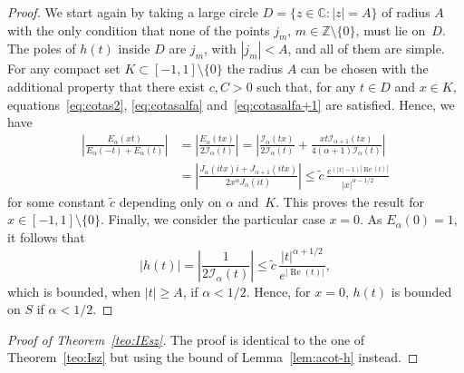 \documentclass[a4paper]{amsart}
\newcommand{\Z}{\mathbb{Z}}
\newcommand{\C}{\mathbb{C}}
\newcommand{\I}{\mathcal{I}}
\newcommand{\Ea}{E_{\alpha}}
\renewcommand{\Re}{\operatorname{Re}}
\renewcommand{\Im}{\operatorname{Im}}
\theoremstyle{plain}
\theoremstyle{definition}
\theoremstyle{remark}
\numberwithin{equation}{section}
\begin{document}
\begin{proof}
We start again by taking a large circle $D=\{z\in\C : |z|=A\}$ of radius $A$ with the only condition that none of the points $j_m$, $m\in \Z\setminus\{0\}$, must lie on~$D$. The poles of $h(t)$ inside $D$ are $j_m$, with $|j_m| < A$, and all of them are simple.
 For any compact set $K\subset [-1,1]\setminus\{0\}$ the radius $A$ can be chosen with the additional property that there exist $c, C > 0$ such that, for any $t \in D$ and $x \in K$, equations~\eqref{eq:cotas2}, \eqref{eq:cotasalfa} and~\eqref{eq:cotasalfa+1} are satisfied. Hence, we have
\begin{align*}
\left| \frac{\Ea(xt)}{\Ea(-t)+\Ea(t)}\right| 
&= \left| \frac{\Ea(tx)}{2 \I_{\alpha}(t)}\right|
= \left| \frac{\I_{\alpha}(tx)}{2\I_{\alpha}(t)}
+ \frac{xt \I_{\alpha+1}(tx)}{4(\alpha+1) \I_{\alpha}(t)}\right| \\
&= \left| \frac{J_{\alpha}(itx) i + J_{\alpha+1}(itx)}{2x^{\alpha} J_{\alpha}(it)} \right|
\leq \tilde{c}\, \frac{e^{(|x|-1)|\Re(t)|}}{|x|^{\alpha-1/2}}
\end{align*}
for some constant $\tilde{c}$ depending only on $\alpha$ and~$K$.
This proves the result for $x \in [-1,1]\setminus\{ 0 \}$. Finally, we consider the particular case $x=0$. As $\Ea(0) = 1$, it follows that
\[
|h(t)| = \left| \frac{1}{2\I_{\alpha}(t)}\right| 
\leq \tilde{c} \,\frac{|t|^{\alpha + 1/2}}{e^{|\Re(t)|}},
\]
which is bounded, when $|t| \geq A$, if $\alpha < 1/2$. Hence, for $x=0$, $h(t)$ is bounded on $S$ if $\alpha < 1/2$. 
\end{proof}

\begin{proof}[Proof of Theorem~\ref{teo:IEsz}]
The proof is identical to the one of Theorem~\ref{teo:Isz} but using the bound of Lemma~\ref{lem:acot-h} instead.
\end{proof}
\end{document}

